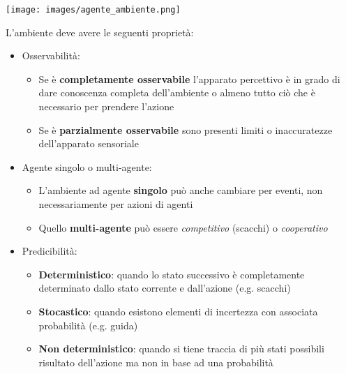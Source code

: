 \begin{center}
	\texttt{[image: images/agente\_ambiente.png]}
\end{center}

L'ambiente deve avere le seguenti proprietà:
\begin{itemize}
	\item Osservabilità:
	\begin{itemize}
		\item Se è \textbf{completamente osservabile} l'apparato percettivo è in grado di dare conoscenza completa dell'ambiente o almeno tutto ciò che è necessario per prendere l'azione
		\item Se è \textbf{parzialmente osservabile} sono presenti limiti o inaccuratezze dell'apparato sensoriale
	\end{itemize}
	\item Agente singolo o multi-agente:
	\begin{itemize}
		\item L'ambiente ad agente \textbf{singolo} può anche cambiare per eventi, non
		necessariamente per azioni di agenti
		\item Quello \textbf{multi-agente} può essere \emph{competitivo} (scacchi) o \emph{cooperativo}
	\end{itemize}
	\item Predicibilità:
	\begin{itemize}
		\item \textbf{Deterministico}: quando lo stato successivo è completamente determinato dallo stato corrente e dall’azione (e.g. scacchi)
		\item \textbf{Stocastico}: quando esistono elementi di incertezza con associata probabilità (e.g. guida)
		\item \textbf{Non deterministico}: quando si tiene traccia di più stati possibili risultato dell’azione ma non in base ad una probabilità
	\end{itemize}
\end{itemize}
\newpage
